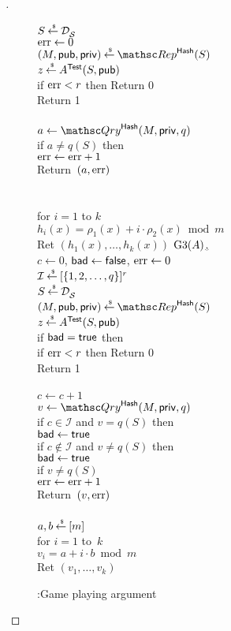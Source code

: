 \begin{proof}[]
\begin{figure}
{{$S {\:\stackrel{{\scriptscriptstyle \hspace{0.2em}\$}} {\leftarrow}\:} \mathcal{D}_{{\cal S}}^{}$\\
$\mathrm{err} \gets 0$\\
$(M,\pubaux,\privaux) \getsr \Rep^{\HashOracle}(S)$\\
$z {\:\stackrel{{\scriptscriptstyle \hspace{0.2em}\$}} {\leftarrow}\:} A^{\mathsf{Test}}(S,{\sf pub})$\\
if $\mathrm{err}  < r$ then Return 0\\
Return 1\\
%
\\
$a \gets \Qry^{\HashOracle}(M,\privaux,q)$\\
if $a \neq q(S)$ then \\
\nudge $\mathrm{err} \gets\mathrm{err} +1$\\
Return~$(a,\mathrm{err} )$\\\\
%
\\
for $i=1$ to $k$\\
\nudge $h_i(x) = \rho_1(x)+i \cdot \rho_2(x) \bmod m$\\
Ret $\left(h_1(x),\ldots,h_k(x)\right)$
}
{
\underline{{$\text{G3}(A)$},}\\
$c\gets 0$, $\mathsf{bad} \gets \mathsf{false}$, $\mathrm{err} \gets 0$\\
$\mathcal{I}{\:\stackrel{{\scriptscriptstyle \hspace{0.2em}\$}} {\leftarrow}\:} [\{1,2,\ldots,q\}]^r$\\
$S {\:\stackrel{{\scriptscriptstyle \hspace{0.2em}\$}} {\leftarrow}\:} \mathcal{D}_{{\cal S}}^{}$\\
$(M,\pubaux,\privaux) \getsr \Rep^{\HashOracle}(S)$\\
$z {\:\stackrel{{\scriptscriptstyle \hspace{0.2em}\$}} {\leftarrow}\:} A^{\mathsf{Test}}(S,{\sf pub})$\\
if $\mathsf{bad} = \mathsf{true}$ then \\
if $\mathrm{err}  < r$ then Return 0\\
Return 1\\
%
\\
$c \gets c+1$\\
$v \gets \Qry^{\HashOracle}(M,\privaux,q)$\\
if $c \in \mathcal{I}$ and $v = q(S)$ then \\
\nudge $\mathsf{bad} \gets \mathsf{true}$ \\
if $c \not\in \mathcal{I}$ and $v \neq q(S)$ then \\
\nudge $\mathsf{bad} \gets \mathsf{true}$\\
if $v \neq q(S)$\\
\nudge $\mathrm{err} \gets\mathrm{err} +1$\\
Return~$(v,\mathrm{err} )$\\
%
\\
$a,b {\:\stackrel{{\scriptscriptstyle \hspace{0.2em}\$}} {\leftarrow}\:} [m]$\\
for $i = 1$ to~$k$\\
\nudge $v_i = a+i \cdot b \bmod m$\\
Ret $\left(v_1,\ldots,v_k\right)$
}
}
\caption{:Game playing argument}\label{fig:Game}
\end{figure}



\end{proof}
